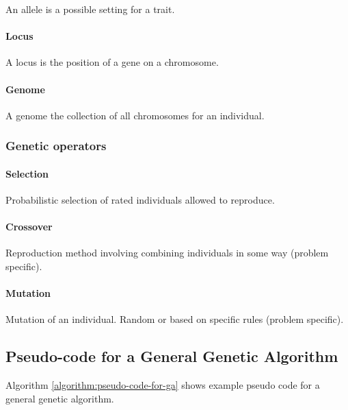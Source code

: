An allele is a possible setting for a trait.

\paragraph{Locus}

A locus is the position of a gene on a chromosome.

\paragraph{Genome}

A genome the collection of all chromosomes for an individual.

\subsubsection{Genetic operators}

\paragraph{Selection}
Probabilistic selection of rated individuals allowed to reproduce.

\paragraph{Crossover}
Reproduction method involving combining individuals in some way (problem specific). 

\paragraph{Mutation}
Mutation of an individual. Random or based on specific rules (problem specific). 

\subsection{Pseudo-code for a General Genetic Algorithm}

Algorithm \vref{algorithm:pseudo-code-for-ga} shows example pseudo code for a general genetic algorithm.

